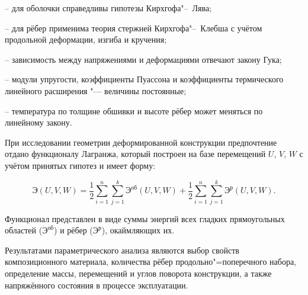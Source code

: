 -- для оболочки справедливы гипотезы Кирхгофа"--~Лява;



-- для рёбер применима теория стержней Кирхгофа"--~Клебша с учётом продольной деформации, изгиба и кручения;



-- зависимость между напряжениями и деформациями отвечают закону Гука;



-- модули упругости, коэффициенты Пуассона и коэффициенты термического линейного расширения "--- величины постоянные;



-- температура по толщине обшивки и высоте рёбер может меняться по линейному закону.



При исследовании геометрии деформированной конструкции предпочтение отдано функционалу Лагранжа, который построен на базе перемещений $U$, $V$, $W$ с учётом принятых гипотез и имеет форму:

$$

\text{Э}(U,V,W)=\frac12\sum_{i=1}^{n}\sum_{j=1}^{k}\text{Э}^\text{об}(U,V,W)+\frac12\sum_{i=1}^{n}\sum_{j=1}^{k}\text{Э}^\text{р}(U,V,W).

$$



Функционал представлен в виде суммы энергий всех гладких прямоугольных областей ($\text{Э}^\text{об}$) и рёбер ($\text{Э}^\text{р}$), окаймляющих их.



Результатами параметрического анализа являются выбор свойств композиционного материала, количества рёбер продольно"=поперечного набора, определение массы, перемещений и углов поворота конструкции, а также напряжённого состояния в процессе эксплуатации.



